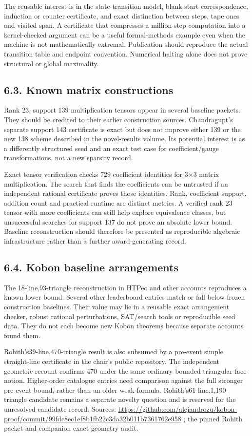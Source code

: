\documentclass[11pt,a4paper]{article}
\begin{document}
The reusable interest is in the state-transition model, blank-start correspondence, induction or counter certificate, and exact distinction between steps, tape ones and visited span. A certificate that compresses a million-step computation into a kernel-checked argument can be a useful formal-methods example even when the machine is not mathematically extremal. Publication should reproduce the actual transition table and endpoint convention. Numerical halting alone does not prove structural or global maximality.

\subsection{6.3. Known matrix constructions}
Rank 23, support 139 multiplication tensors appear in several baseline packets. They should be credited to their earlier construction sources. Chandragupt's separate support 143 certificate is exact but does not improve either 139 or the new 138 scheme described in the novel-results volume. Its potential interest is as a differently structured seed and an exact test case for coefficient/gauge transformations, not a new sparsity record.

Exact tensor verification checks 729 coefficient identities for 3\ensuremath{\times}3 matrix multiplication. The search that finds the coefficients can be untrusted if an independent rational certificate proves those identities. Rank, coefficient support, addition count and practical runtime are distinct metrics. A verified rank 23 tensor with more coefficients can still help explore equivalence classes, but unsuccessful searches for support 137 do not prove an absolute lower bound. Baseline reconstruction should therefore be presented as reproducible algebraic infrastructure rather than a further award-generating record.

\subsection{6.4. Kobon baseline arrangements}
The 18-line,93-triangle reconstruction in HTPeo and other accounts reproduces a known lower bound. Several other leaderboard entries match or fall below frozen construction baselines. Their value may lie in a reusable exact arrangement checker, robust rational perturbations, SAT/search tools or reproducible seed data. They do not each become new Kobon theorems because separate accounts found them.

Rohith's39-line,470-triangle result is also subsumed by a pre-event simple straight-line certificate in the chair's public repository. The independent geometric recount confirms 470 under the same ordinary bounded-triangular-face notion. Higher-order catalogue entries need comparison against the full stronger pre-event bound, rather than an older weak formula. Rohith's61-line,1,190-triangle candidate remains a separate novelty question and is reserved for the unresolved-candidate record. Sources: \url{https://github.com/alejandrozu/kobon-proof/commit/99fdc8ec1ef8b1fb22c3da32b011b7361762e958} ; the pinned Rohith packet and companion exact-geometry audit.
\end{document}
